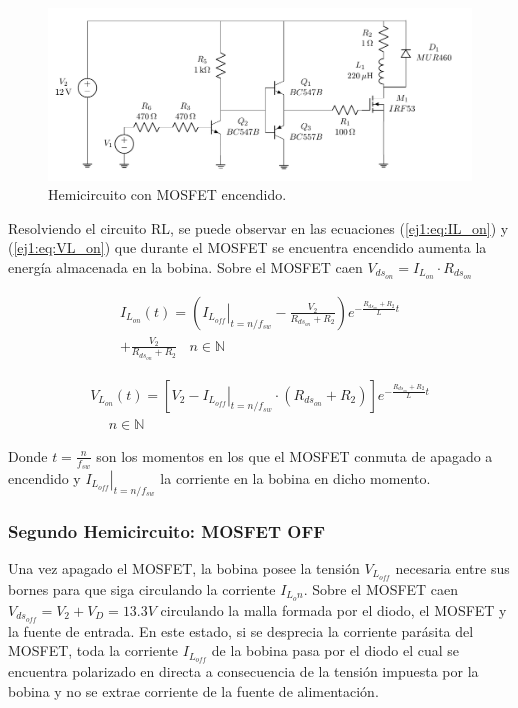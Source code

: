 \begin{figure}[]
	\centering
	\includegraphics[width=0.4\linewidth, page=3]{ImagenesEjercicio-1/CircuitsEj1}
	\caption{Hemicircuito con MOSFET encendido.}
	\label{ej1:fig:circuito_on}
\end{figure}

Resolviendo el circuito RL, se puede observar en las ecuaciones (\ref{ej1:eq:IL_on}) y (\ref{ej1:eq:VL_on}) que durante el MOSFET se encuentra encendido aumenta la energía almacenada en la bobina. Sobre el MOSFET caen $V_{ds_{on}} = I_{L_{on}}\cdot R_{ds_{on}}$

\begin{equation}
\begin{gathered}
	 I_{L_{on}}(t) = \left( \left. I_{L_{off}} \right|_{t= n/f_{sw}} -\frac{V_2}{R_{ds_{on}}+R_2}\right) e^{-\frac{R_{ds_{on}}+R_2}{L}t} \\ + \frac{V_2}{R_{ds_{on}}+R_2} \ \ \ \ n \in \mathbb{N}
\end{gathered}
\label{ej1:eq:IL_on}
\end{equation}

\begin{equation}
\begin{gathered}
	V_{L_{on}}(t) = \left[ V_2 - \left. I_{L_{off}} \right|_{t= n/f_{sw}}\cdot (R_{ds_{on}}+R_2) \right]e^{-\frac{R_{ds_{on}}+R_2}{L}t} \\ \ \ \ \ \ \ n \in \mathbb{N}
\end{gathered}
\label{ej1:eq:VL_on}
\end{equation}

Donde $t=\frac{n}{f_{sw}}$ son los momentos en los que el MOSFET conmuta de apagado a encendido y $\left. I_{L_{off}} \right|_{t= n/f_{sw}}$ la corriente en la bobina en dicho momento.

\subsubsection{Segundo Hemicircuito: MOSFET OFF}

Una vez apagado el MOSFET, la bobina posee la tensión $V_{L_{off}}$ necesaria entre sus bornes para que siga circulando la corriente $I_{L_on}$. Sobre el MOSFET caen $V_{ds_{off}} = V_2 + V_D = 13.3V$ circulando la malla formada por el diodo, el MOSFET y la fuente de entrada. En este estado, si se desprecia la corriente parásita del MOSFET, toda la corriente $I_{L_{off}}$ de la bobina pasa por el diodo el cual se encuentra polarizado en directa a consecuencia de la tensión impuesta por la bobina y no se extrae corriente de la fuente de alimentación.

